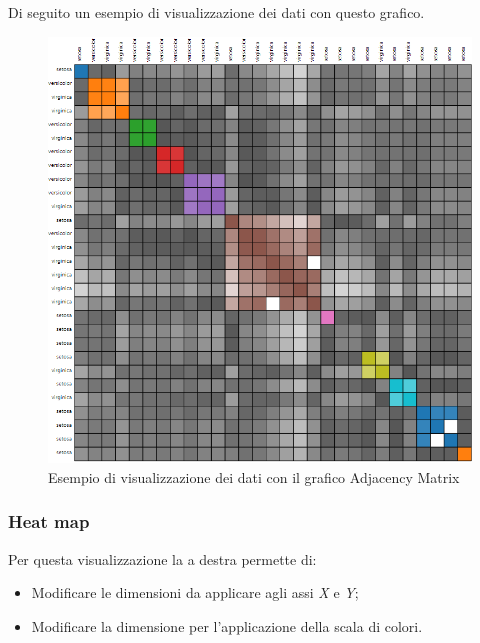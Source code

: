 \newpage
Di seguito un esempio di visualizzazione dei dati con questo grafico.

\begin{figure}[H]
		\includegraphics[scale=0.6]{Images/am.png}
		\centering
		\caption{Esempio di visualizzazione dei dati con il grafico Adjacency Matrix}
\end{figure}

\newpage

\subsubsection{Heat map}

Per questa visualizzazione la  a destra permette di:
\begin{itemize}
	\item Modificare le dimensioni da applicare agli assi \textit{X} e \textit{Y};
	\item Modificare la dimensione per l'applicazione della scala di colori.
\end{itemize} 

